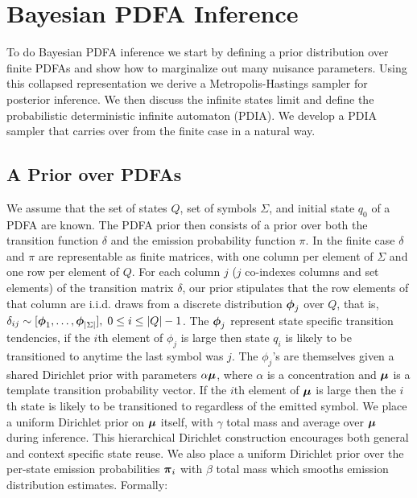 \section{Bayesian PDFA Inference}

To do Bayesian PDFA inference we start by defining a prior distribution over finite PDFAs and show how to marginalize out many nuisance parameters.  Using this collapsed representation we derive a Metropolis-Hastings sampler for posterior inference.  We then discuss the infinite states limit and define the probabilistic deterministic infinite automaton (PDIA).  We develop a PDIA sampler that carries over from the finite case in a natural way.


\subsection{A Prior over PDFAs}

We assume that the set of states $Q$, set of symbols $\Sigma$, and initial state $q_0$ of a PDFA are known.  The PDFA prior then consists of a prior over both the transition function $\delta$ and the emission probability function $\pi$.  In the finite case $\delta$ and $\pi$ are representable as finite matrices, with one column per element of $\Sigma$ and one row per element of $Q$.  For each column $j$ ($j$ co-indexes columns and set elements) of the transition matrix $\delta$, our prior stipulates that the row elements of that column are  i.i.d. draws from a discrete distribution $\bphi_j$ over $Q$, that is, $\delta_{ij} \sim [\bphi_1,\ldots,\bphi_{|\Sigma|}], \; 0 \leq i\leq|Q|-1$.  The $\bphi_j$ represent state specific transition tendencies, if the $i$th element of $\phi_{j}$ is large then state $q_i$ is likely to be transitioned to anytime the last symbol was $j.$   The $\phi_{j}$'s are   themselves given a shared Dirichlet prior with parameters $\alpha\bmu$, where $\alpha$ is a concentration and $\bmu$ is a template transition probability vector.   If the $i$th element of $\bmu$ is large then the $i$th state is likely to be transitioned to regardless of the emitted symbol.  We place a uniform Dirichlet prior on $\bmu$ itself, with $\gamma$ total mass and average over $\bmu$ during inference.  This hierarchical Dirichlet construction encourages both general and context specific state reuse.
 We also place a uniform Dirichlet prior over the per-state emission probabilities $\bpi_i$ with $\beta$ total mass which smooths emission distribution estimates.  Formally:

